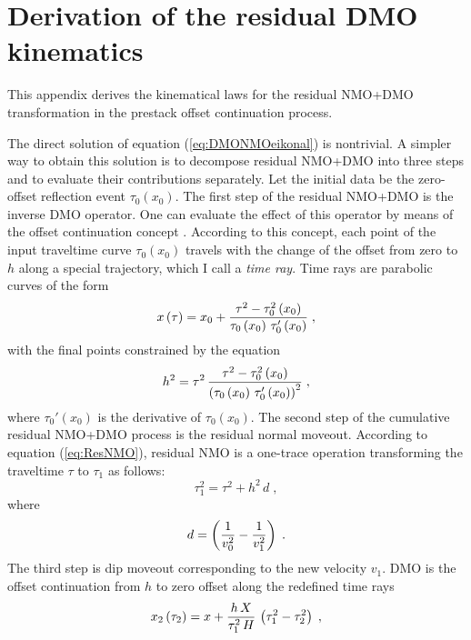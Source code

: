 \section{Derivation of the residual DMO kinematics}

This appendix derives the kinematical laws for the residual NMO+DMO
transformation in the prestack offset continuation process.

The direct solution of equation (\ref{eq:DMONMOeikonal}) is
nontrivial. A simpler way to obtain this solution is to decompose
residual NMO+DMO into three steps and to evaluate their contributions
separately. Let the initial data be the zero-offset reflection event
$\tau_0(x_0)$. The first step of the residual NMO+DMO is the inverse
DMO operator. One can evaluate the effect of this operator by means of
the offset continuation concept \cite[]{ofcon}. According to this
concept, each point of the input traveltime curve $\tau_0(x_0)$
travels with the change of the offset from zero to $h$ along a special
trajectory, which I call a {\em time ray}. Time rays are parabolic
curves of the form
\begin{equation}
x\left(\tau\right) =  x_0+{{\tau^2-\tau_0^2\left(x_0\right)} \over
{\tau_0\left(x_0\right)\,\tau_0'\left(x_0\right)}}\;,
\label{eq:xoftau}
\end{equation}
with the final points constrained by the equation
\begin{equation}
h^2 = \tau^2\,{{\tau^2-\tau_0^2\left(x_0\right)} \over
{\left(\tau_0\left(x_0\right)\,\tau_0'\left(x_0\right)\right)^2}}\;,
\label{eq:hoftau}
\end{equation}
where $\tau_0'\left(x_0\right)$ is the derivative of 
$\tau_0\left(x_0\right)$.
The second step of the cumulative residual NMO+DMO process is the
residual normal moveout. According to equation (\ref{eq:ResNMO}), residual
NMO is a one-trace operation transforming the traveltime $\tau$ to
$\tau_1$ as follows:
\begin{equation}
\tau_1^2 = \tau^2 + h^2\,d\;,
\label{eq:ResNMO2} 
\end{equation}
where
\begin{equation}
d = \left({1 \over v_0^2} - {1 \over v_1^2}\right)\;.
\label{eq:formers}
\end{equation}
The third step is dip moveout corresponding to the new velocity
$v_1$. DMO is the offset continuation from $h$ to zero
offset along the redefined time rays \cite[]{ofcon}
\begin{equation}
x_2\left(\tau_2\right) =  
x + {{h\,X} \over {\tau_1^2\,H}}\,\left(\tau_1^2-\tau_2^2\right)\;,
\label{eq:xoftau2}
\end{equation}

